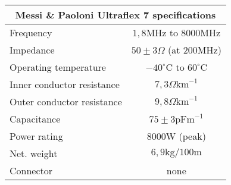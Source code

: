 \footnotesize
\begin{tabular}{|l|c|}
	\hline
	\multicolumn{2}{|c|}{\textbf{Messi \& Paoloni Ultraflex 7 specifications}} \\
	\hline
 	Frequency & $1,8\mathrm{MHz}$ to $8000\mathrm{MHz}$ \\
	Impedance & $50\pm3\Omega$ (at $200\mathrm{MHz}$)\\
	Operating temperature & $-40^\circ \mathrm{C}$ to $60^\circ \mathrm{C}$ \\
	Inner conductor resistance & $7,3\Omega\mathrm{km}^{-1}$ \\
	Outer conductor resistance & $9,8\Omega\mathrm{km}^{-1}$ \\
	Capacitance & $75\pm3\mathrm{pFm}^{-1}$ \\
	Power rating & $8000\mathrm{W}$ (peak) \\
	Net. weight & $6,9\mathrm{kg}/100\mathrm{m}$ \\
	Connector & none \\
	\hline
\end{tabular}